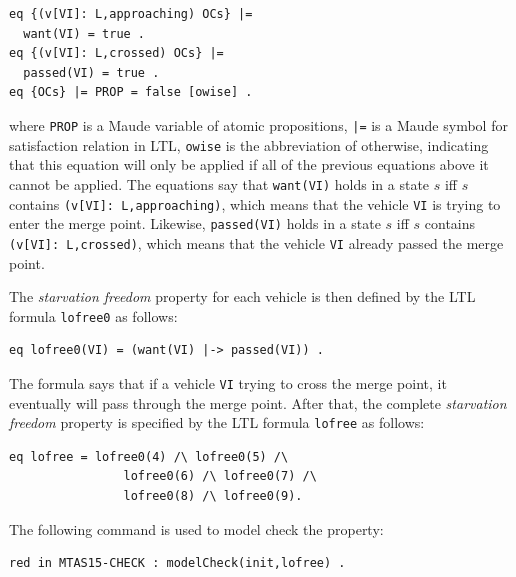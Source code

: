 \documentclass[10pt, conference, compsocconf]{IEEEtran}
\begin{document}
\begin{small}
\begin{verbatim}
eq {(v[VI]: L,approaching) OCs} |= 
  want(VI) = true .
eq {(v[VI]: L,crossed) OCs} |= 
  passed(VI) = true .
eq {OCs} |= PROP = false [owise] .
\end{verbatim}
\end{small}

\noindent
where \verb!PROP! is a Maude variable of atomic propositions, \verb!|=! is a Maude symbol for satisfaction relation in LTL,
\verb!owise! is the abbreviation of otherwise, indicating that this equation will only be applied if all of the previous equations above it cannot be applied. 
The equations say that \verb!want(VI)! holds in a state $s$ iff $s$ contains \verb!(v[VI]: L,approaching)!, which means that the vehicle \verb!VI! is trying to enter the merge point. 
Likewise, \verb!passed(VI)! holds in a state $s$ iff $s$ contains \verb!(v[VI]: L,crossed)!, which means that the vehicle \verb!VI! already passed the merge point. 

The \textit{starvation freedom} property for each vehicle is then defined by the LTL formula \verb!lofree0!  as follows:

\begin{small}
\begin{verbatim}
eq lofree0(VI) = (want(VI) |-> passed(VI)) .
\end{verbatim}
\end{small}

\noindent
The formula says that if a vehicle \verb!VI! trying to cross the merge point, it eventually will pass through the merge point.
After that, the complete \textit{starvation freedom} property is specified by the LTL formula \verb!lofree! as follows:

\begin{small}
\begin{verbatim}
eq lofree = lofree0(4) /\ lofree0(5) /\ 
				lofree0(6) /\ lofree0(7) /\ 
				lofree0(8) /\ lofree0(9).
\end{verbatim}
\end{small}

The following command is used to model check the property:
\begin{small}
\begin{verbatim}
red in MTAS15-CHECK : modelCheck(init,lofree) .
\end{verbatim}
\end{small}
\end{document}
